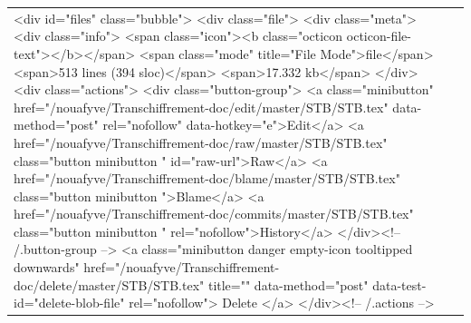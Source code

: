 \documentclass[a4paper,11pt,french]{article}
\begin{document}
\begin{tabular}{|m{8cm}|m{8cm}|}
<div id="files" class="bubble">
  <div class="file">
    <div class="meta">
      <div class="info">
        <span class="icon"><b class="octicon octicon-file-text"></b></span>
        <span class="mode" title="File Mode">file</span>
          <span>513 lines (394 sloc)</span>
        <span>17.332 kb</span>
      </div>
      <div class="actions">
        <div class="button-group">
                <a class="minibutton"
                   href="/nouafyve/Transchiffrement-doc/edit/master/STB/STB.tex"
                   data-method="post" rel="nofollow" data-hotkey="e">Edit</a>
          <a href="/nouafyve/Transchiffrement-doc/raw/master/STB/STB.tex" class="button minibutton " id="raw-url">Raw</a>
            <a href="/nouafyve/Transchiffrement-doc/blame/master/STB/STB.tex" class="button minibutton ">Blame</a>
          <a href="/nouafyve/Transchiffrement-doc/commits/master/STB/STB.tex" class="button minibutton " rel="nofollow">History</a>
        </div><!-- /.button-group -->
          <a class="minibutton danger empty-icon tooltipped downwards"
             href="/nouafyve/Transchiffrement-doc/delete/master/STB/STB.tex"
             title=""
             data-method="post" data-test-id="delete-blob-file" rel="nofollow">
          Delete
        </a>
      </div><!-- /.actions -->


\end{tabular}
\end{document}
